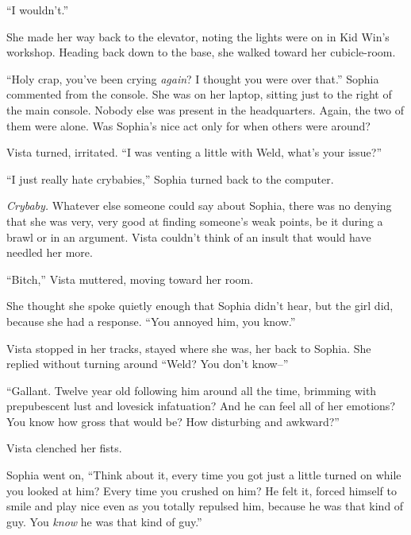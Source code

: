 ``I wouldn't.''



She made her way back to the elevator, noting the lights were on in Kid Win's workshop.  Heading back down to the base, she walked toward her cubicle-room.



``Holy crap, you've been crying \emph{again}?  I thought you were over that.''  Sophia commented from the console.  She was on her laptop, sitting just to the right of the main console.  Nobody else was present in the headquarters.  Again, the two of them were alone.  Was Sophia's nice act only for when others were around?



Vista turned, irritated.  ``I was venting a little with Weld, what's your issue?''



``I just really hate crybabies,'' Sophia turned back to the computer.



\emph{Crybaby.}  Whatever else someone could say about Sophia, there was no denying that she was very, very good at finding someone's weak points, be it during a brawl or in an argument.  Vista couldn't think of an insult that would have needled her more.



``Bitch,'' Vista muttered, moving toward her room.



She thought she spoke quietly enough that Sophia didn't hear, but the girl did, because she had a response.  ``You annoyed him, you know.''



Vista stopped in her tracks, stayed where she was, her back to Sophia.  She replied without turning around ``Weld?  You don't know--''



``Gallant.  Twelve year old following him around all the time, brimming with prepubescent lust and lovesick infatuation?  And he can feel all of her emotions?  You know how gross that would be?  How disturbing and awkward?''



Vista clenched her fists.



Sophia went on, ``Think about it, every time you got just a little turned on while you looked at him?  Every time you crushed on him?  He felt it, forced himself to smile and play nice even as you totally repulsed him, because he was that kind of guy.  You \emph{know} he was that kind of guy.''



